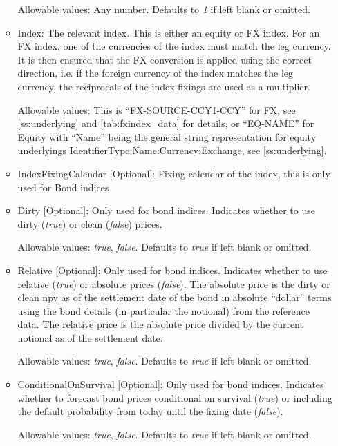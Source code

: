 \begin{itemize}
\begin{itemize}
  Allowable values: Any number. Defaults to \emph{1} if left blank or omitted.

\item Index: The relevant index. This is either an equity or FX index. For an FX index, one of the currencies of the
  index must match the leg currency. It is then ensured that the FX conversion is applied using the correct direction,
  i.e. if the foreign currency of the index matches the leg currency, the reciprocals of the index fixings are used as a
  multiplier.

  Allowable values: This is ``FX-SOURCE-CCY1-CCY'' for FX, see \ref{ss:underlying} and \ref{tab:fxindex_data} for
  details, or ``EQ-NAME'' for Equity with ``Name'' being the general string representation for equity underlyings
  {IdentifierType}:{Name}:{Currency}:{Exchange}, see \ref{ss:underlying}.

\item IndexFixingCalendar [Optional]: Fixing calendar of the index, this is only used for Bond indices


\item Dirty [Optional]: Only used for bond indices. Indicates whether to use dirty (\emph{true}) or clean
  (\emph{false}) prices.

  Allowable values: \emph{true}, \emph{false}. Defaults to \emph{true} if left blank or omitted. 

\item Relative [Optional]: Only used for bond indices. Indicates whether to use relative (\emph{true}) or
  absolute prices (\emph{false}). The absolute price is the dirty or clean npv as of the settlement date of the bond in
  absolute ``dollar'' terms using the bond details (in particular the notional) from the reference data. The relative
  price is the absolute price divided by the current notional as of the settlement date.

  Allowable values: \emph{true}, \emph{false}. Defaults to \emph{true} if left blank or omitted. 

\item ConditionalOnSurvival [Optional]: Only used for bond indices. Indicates whether to forecast bond
  prices conditional on survival (\emph{true}) or including the default probability from today until the fixing date (\emph{false}).

  Allowable values: \emph{true}, \emph{false}. Defaults to \emph{true} if left blank or omitted. 


\end{itemize}
\end{itemize}
